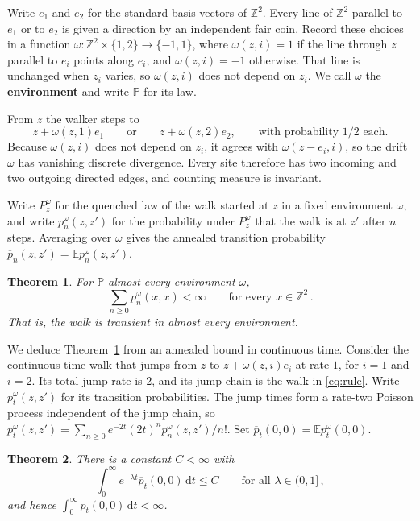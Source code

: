 \documentclass[11pt]{amsart}
\theoremstyle{plain}
\newtheorem{theorem}{Theorem}[section]
\theoremstyle{definition}
\newcommand{\Z}{\mathbb Z}
\newcommand{\E}{\mathbb E}
\renewcommand{\P}{\mathbb P}
\newcommand{\1}{\mathbf 1}
\newcommand{\dd}{\,\mathrm d}
\newcommand{\defn}[1]{\textbf{#1}}
\begin{document}
Write $e_1$ and $e_2$ for the standard basis vectors of $\Z^2$.  Every line
of $\Z^2$ parallel to $e_1$ or to $e_2$ is given a direction by an
independent fair coin.  Record these choices in a function
$\omega\colon\Z^2\times\{1,2\}\to\{-1,1\}$, where $\omega(z,i)=1$ if the line
through $z$ parallel to $e_i$ points along $e_i$, and $\omega(z,i)=-1$
otherwise.  That line is unchanged when $z_i$ varies, so $\omega(z,i)$ does
not depend on $z_i$.  We call $\omega$ the \defn{environment} and write $\P$
for its law.

From $z$ the walker steps to
\begin{equation}\label{eq:rule}
  z+\omega(z,1)e_1\qquad\text{or}\qquad z+\omega(z,2)e_2,
  \qquad\text{with probability $1/2$ each.}
\end{equation}
Because $\omega(z,i)$ does not
depend on $z_i$, it agrees with $\omega(z-e_i,i)$, so the drift $\omega$ has
vanishing discrete divergence.  Every site therefore has two incoming and two
outgoing directed edges, and counting measure is invariant.

Write $P^\omega_z$ for the quenched law of the walk started at $z$ in a fixed
environment $\omega$, and write $p^\omega_n(z,z')$ for the probability under
$P^\omega_z$ that the walk is at $z'$ after $n$ steps.
Averaging over $\omega$ gives the annealed transition probability
$\overline p_n(z,z')=\E p^\omega_n(z,z')$.

\begin{theorem}\label{thm:main}
For $\P$-almost every environment $\omega$,
\[
  \sum_{n\geq0}p^\omega_n(x,x)<\infty\qquad\text{for every }x\in\Z^2\, .
\]
That is, the walk is transient in almost every environment.
\end{theorem}

We deduce Theorem~\ref{thm:main} from an annealed bound in continuous time.
Consider the continuous-time walk that jumps from $z$ to $z+\omega(z,i)e_i$
at rate $1$, for $i=1$ and $i=2$.  Its total jump rate is $2$, and its jump
chain is the walk in \eqref{eq:rule}.  Write $p^\omega_t(z,z')$ for its transition probabilities.  The jump times form a rate-two Poisson process independent of the jump chain, so
$p^\omega_t(z,z')=\sum_{n\geq0}e^{-2t}(2t)^np^\omega_n(z,z')/n!$.  Set
$\overline p_t(0,0)=\E p^\omega_t(0,0)$.

\begin{theorem}\label{thm:annealed}
There is a constant $C<\infty$ with
\[
  \int_0^\infty e^{-\lambda t}\overline p_t(0,0)\dd t\leq C
  \qquad\text{for all }\lambda\in(0,1]\, ,
\]
and hence $\int_0^\infty\overline p_t(0,0)\dd t<\infty$.
\end{theorem}
\end{document}
